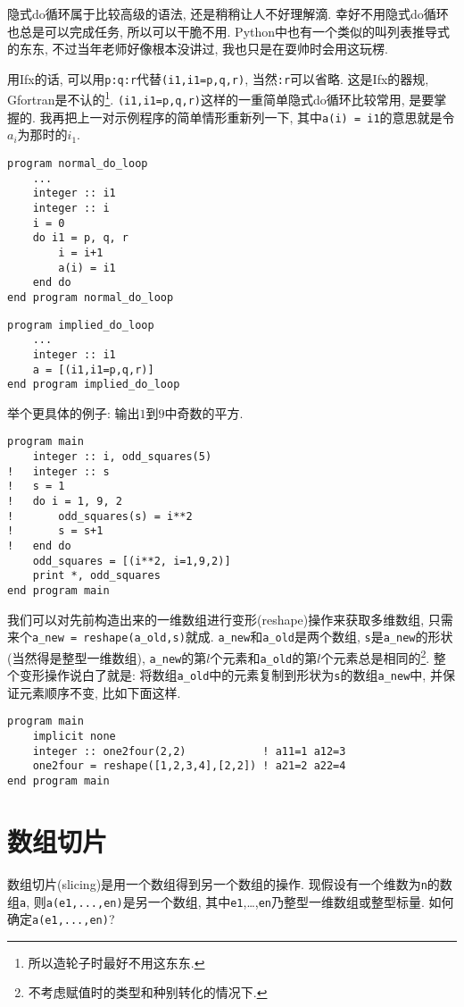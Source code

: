 隐式do循环属于比较高级的语法, 还是稍稍让人不好理解滴. 幸好不用隐式do循环也总是可以完成任务, 所以可以干脆不用. Python中也有一个类似的叫列表推导式的东东, 不过当年老师好像根本没讲过, 我也只是在耍帅时会用这玩楞.

用Ifx的话, 可以用\texttt{p:q:r}代替\texttt{(i1,i1=p,q,r)}, 当然\texttt{:r}可以省略. 这是Ifx的器规, Gfortran是不认的\footnote{
所以造轮子时最好不用这东东.
}. \texttt{(i1,i1=p,q,r)}这样的一重简单隐式do循环比较常用, 是要掌握的. 我再把上一对示例程序的简单情形重新列一下, 其中\texttt{a(i) = i1}的意思就是令$a_i$为那时的$i_1$.
\begin{lstlisting}
program normal_do_loop
    ...
    integer :: i1
    integer :: i
    i = 0
    do i1 = p, q, r
        i = i+1
        a(i) = i1
    end do
end program normal_do_loop
\end{lstlisting}
\begin{lstlisting}
program implied_do_loop
    ...
    integer :: i1
    a = [(i1,i1=p,q,r)]
end program implied_do_loop
\end{lstlisting}
举个更具体的例子: 输出$1$到$9$中奇数的平方.
\begin{lstlisting}
program main
    integer :: i, odd_squares(5)
!   integer :: s
!   s = 1
!   do i = 1, 9, 2
!       odd_squares(s) = i**2
!       s = s+1
!   end do
    odd_squares = [(i**2, i=1,9,2)]
    print *, odd_squares
end program main
\end{lstlisting}

我们可以对先前构造出来的一维数组进行变形(reshape)操作来获取多维数组, 只需来个\texttt{a\_{}new = reshape(a\_{}old,s)}就成. \texttt{a\_{}new}和\texttt{a\_{}old}是两个数组, \texttt{s}是\texttt{a\_{}new}的形状(当然得是整型一维数组), \texttt{a\_{}new}的第$l$个元素和\texttt{a\_{}old}的第$l$个元素总是相同的\footnote{
不考虑赋值时的类型和种别转化的情况下.
}. 整个变形操作说白了就是: 将数组\texttt{a\_{}old}中的元素复制到形状为\texttt{s}的数组\texttt{a\_{}new}中, 并保证元素顺序不变, 比如下面这样.
\begin{lstlisting}
program main
    implicit none
    integer :: one2four(2,2)            ! a11=1 a12=3
    one2four = reshape([1,2,3,4],[2,2]) ! a21=2 a22=4
end program main
\end{lstlisting}

\section{数组切片}

数组切片(slicing)是用一个数组得到另一个数组的操作. 现假设有一个维数为\texttt{n}的数组\texttt{a}, 则\texttt{a(e1,...,en)}是另一个数组, 其中\texttt{e1},\dots ,\texttt{en}乃整型一维数组或整型标量. 如何确定\texttt{a(e1,...,en)}?

